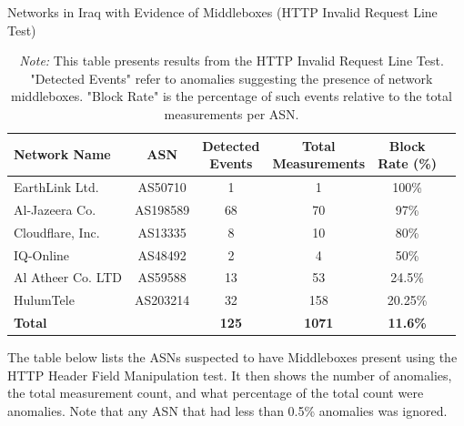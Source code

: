 \vspace{2em}

\begin{table}[H]
\centering
\caption{Networks in Iraq with Evidence of Middleboxes (HTTP Invalid Request Line Test)}
\begin{tabular}{lccccc}
\toprule
\textbf{Network Name} & \textbf{ASN} & \shortstack{\textbf{Detected} \\ \textbf{Events}} & \shortstack{\textbf{Total} \\ \textbf{Measurements}} & \shortstack{\textbf{Block} \\ \textbf{Rate (\%)}} \\
\midrule
EarthLink Ltd.        & AS50710   & 1  & 1   & 100\%    \\
Al-Jazeera Co.        & AS198589  & 68 & 70  & 97\%     \\
Cloudflare, Inc.      & AS13335   & 8  & 10  & 80\%     \\
IQ-Online             & AS48492   & 2  & 4   & 50\%     \\
Al Atheer Co. LTD     & AS59588   & 13 & 53  & 24.5\%   \\
HulumTele             & AS203214  & 32 & 158 & 20.25\%  \\
\bottomrule
\textbf{Total} & & \textbf{125} & \textbf{1071} & \textbf{11.6\%} \\
\end{tabular}

\vspace{1em}

\caption*{\textit{Note:} This table presents results from the HTTP Invalid Request Line Test. "Detected Events" refer to anomalies suggesting the presence of network middleboxes. "Block Rate" is the percentage of such events relative to the total measurements per ASN.}
\label{tab:middlebox_http_invalid}
\end{table}


The table below lists the ASNs suspected to have Middleboxes present using the HTTP Header Field Manipulation test. It then shows the number of anomalies, the total measurement count, and what percentage of the total count were anomalies. Note that any ASN that had less than 0.5\% anomalies was ignored.

